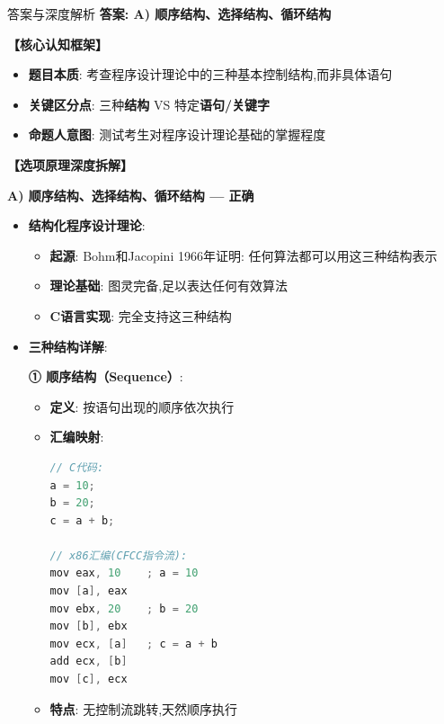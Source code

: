 \documentclass[a4paper,12pt]{article}
\begin{document}
\begin{bluebox}{答案与深度解析}
	\textbf{答案: A) 顺序结构、选择结构、循环结构}

	\textbf{【核心认知框架】}
	\begin{itemize}[leftmargin=*, nosep]
		\item \textbf{题目本质}: 考查程序设计理论中的三种基本控制结构,而非具体语句
		\item \textbf{关键区分点}: 三种\textbf{结构} VS 特定\textbf{语句/关键字}
		\item \textbf{命题人意图}: 测试考生对程序设计理论基础的掌握程度
	\end{itemize}

	\textbf{【选项原理深度拆解】}

	\textbf{A) 顺序结构、选择结构、循环结构 — 正确}
	\begin{itemize}[leftmargin=*, nosep]
		\item \textbf{结构化程序设计理论}:
		      \begin{itemize}
			      \item \textbf{起源}: Bohm和Jacopini 1966年证明: 任何算法都可以用这三种结构表示
			      \item \textbf{理论基础}: 图灵完备,足以表达任何有效算法
			      \item \textbf{C语言实现}: 完全支持这三种结构
		      \end{itemize}

		\item \textbf{三种结构详解}:

		      \textbf{① 顺序结构（Sequence）}:
		      \begin{itemize}
			      \item \textbf{定义}: 按语句出现的顺序依次执行
			      \item \textbf{汇编映射}:
			            \begin{lstlisting}[language=C]
// C代码:
a = 10;
b = 20;
c = a + b;

// x86汇编(CFCC指令流):
mov eax, 10    ; a = 10
mov [a], eax
mov ebx, 20    ; b = 20
mov [b], ebx
mov ecx, [a]   ; c = a + b
add ecx, [b]
mov [c], ecx
        \end{lstlisting}
			      \item \textbf{特点}: 无控制流跳转,天然顺序执行
		      \end{itemize}


\end{itemize}
\end{bluebox}
\end{document}
